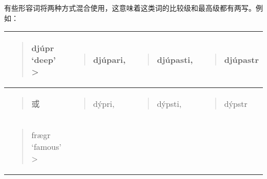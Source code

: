 有些形容词将两种方式混合使用，这意味着这类词的比较级和最高级都有两写。例如：

\begin{longtable}{llll}
  \toprule
  \begin{quote}djúpr `deep‌' \textgreater{}\end{quote} & \begin{quote}djúpari,\end{quote}            & \begin{quote}djúpasti,\end{quote}           & \begin{quote}djúpastr\end{quote} \\
  \midrule
  \endhead
  \bottomrule
  \endfoot
  \begin{minipage}[t]{\linewidth}\raggedright
    \begin{quote}
      或
    \end{quote}
  \end{minipage}         & \begin{minipage}[t]{\linewidth}\raggedright
                             \begin{quote}
      dýpri,
    \end{quote}
                           \end{minipage} & \begin{minipage}[t]{\linewidth}\raggedright
                                              \begin{quote}
      dýpsti,
    \end{quote}
                                            \end{minipage} & \begin{minipage}[t]{\linewidth}\raggedright
                                                               \begin{quote}
      dýpstr
    \end{quote}
                                                             \end{minipage}                                                                              \\
  \begin{minipage}[t]{\linewidth}\raggedright
    \begin{quote}
      frægr `famous‌' \textgreater{}
    \end{quote}
  \end{minipage}         & \begin{minipage}[t]{\linewidth}\raggedright

\end{minipage}
\end{longtable}
